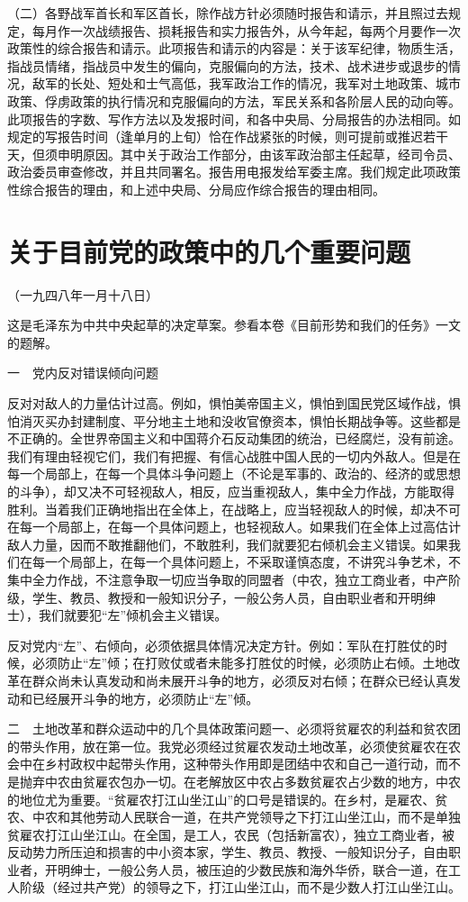 \documentclass[UTF-8, a5paper, 12pt]{ctexart}
\begin{document}
（二）各野战军首长和军区首长，除作战方针必须随时报告和请示，并且照过去规定，每月作一次战绩报告、损耗报告和实力报告外，从今年起，每两个月要作一次政策性的综合报告和请示。此项报告和请示的内容是：关于该军纪律，物质生活，指战员情绪，指战员中发生的偏向，克服偏向的方法，技术、战术进步或退步的情况，敌军的长处、短处和士气高低，我军政治工作的情况，我军对土地政策、城市政策、俘虏政策的执行情况和克服偏向的方法，军民关系和各阶层人民的动向等。此项报告的字数、写作方法以及发报时间，和各中央局、分局报告的办法相同。如规定的写报告时间（逢单月的上旬）恰在作战紧张的时候，则可提前或推迟若干天，但须申明原因。其中关于政治工作部分，由该军政治部主任起草，经司令员、政治委员审查修改，并且共同署名。报告用电报发给军委主席。我们规定此项政策性综合报告的理由，和上述中央局、分局应作综合报告的理由相同。 

\section{关于目前党的政策中的几个重要问题}


（一九四八年一月十八日）

这是毛泽东为中共中央起草的决定草案。参看本卷《目前形势和我们的任务》一文的题解。

一　党内反对错误倾向问题

反对对敌人的力量估计过高。例如，惧怕美帝国主义，惧怕到国民党区域作战，惧怕消灭买办封建制度、平分地主土地和没收官僚资本，惧怕长期战争等。这些都是不正确的。全世界帝国主义和中国蒋介石反动集团的统治，已经腐烂，没有前途。我们有理由轻视它们，我们有把握、有信心战胜中国人民的一切内外敌人。但是在每一个局部上，在每一个具体斗争问题上（不论是军事的、政治的、经济的或思想的斗争），却又决不可轻视敌人，相反，应当重视敌人，集中全力作战，方能取得胜利。当着我们正确地指出在全体上，在战略上，应当轻视敌人的时候，却决不可在每一个局部上，在每一个具体问题上，也轻视敌人。如果我们在全体上过高估计敌人力量，因而不敢推翻他们，不敢胜利，我们就要犯右倾机会主义错误。如果我们在每一个局部上，在每一个具体问题上，不采取谨慎态度，不讲究斗争艺术，不集中全力作战，不注意争取一切应当争取的同盟者（中农，独立工商业者，中产阶级，学生、教员、教授和一般知识分子，一般公务人员，自由职业者和开明绅士），我们就要犯“左”倾机会主义错误。

反对党内“左”、右倾向，必须依据具体情况决定方针。例如：军队在打胜仗的时候，必须防止“左”倾；在打败仗或者未能多打胜仗的时候，必须防止右倾。土地改革在群众尚未认真发动和尚未展开斗争的地方，必须反对右倾；在群众已经认真发动和已经展开斗争的地方，必须防止“左”倾。

二　土地改革和群众运动中的几个具体政策问题一、必须将贫雇农的利益和贫农团的带头作用，放在第一位。我党必须经过贫雇农发动土地改革，必须使贫雇农在农会中在乡村政权中起带头作用，这种带头作用即是团结中农和自己一道行动，而不是抛弃中农由贫雇农包办一切。在老解放区中农占多数贫雇农占少数的地方，中农的地位尤为重要。“贫雇农打江山坐江山”的口号是错误的。在乡村，是雇农、贫农、中农和其他劳动人民联合一道，在共产党领导之下打江山坐江山，而不是单独贫雇农打江山坐江山。在全国，是工人，农民（包括新富农），独立工商业者，被反动势力所压迫和损害的中小资本家，学生、教员、教授、一般知识分子，自由职业者，开明绅士，一般公务人员，被压迫的少数民族和海外华侨，联合一道，在工人阶级（经过共产党）的领导之下，打江山坐江山，而不是少数人打江山坐江山。
\end{document}
